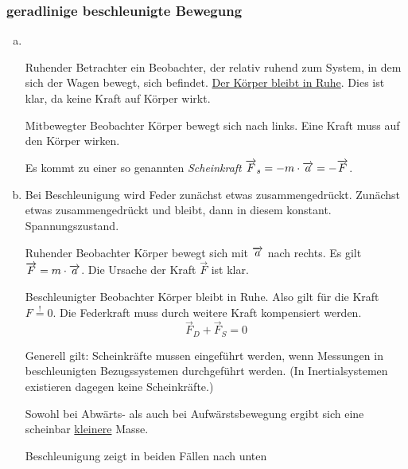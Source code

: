\documentclass[a4paper,10pt]{scrartcl}
\begin{document}
\subsubsection{geradlinige beschleunigte Bewegung}
\begin{enumerate}[a)]
 \item {}\\
\begin{seg}{Ruhender Betrachter}
ein Beobachter, der relativ ruhend zum System, in dem sich der Wagen bewegt, sich befindet.
\underline{Der Körper bleibt in Ruhe}. Dies ist klar, da keine Kraft auf Körper wirkt.
\end{seg}
\begin{seg}{Mitbewegter Beobachter}
 Körper bewegt sich nach links. Eine Kraft muss auf den Körper wirken.
\end{seg}
Es kommt zu einer so genannten \emph{Scheinkraft} $\overrightarrow{F}_s=-m\cdot \overrightarrow{a}=-\overrightarrow{F}$.
\item {}
Bei Beschleunigung wird Feder zunächst etwas zusammengedrückt. Zunächst etwas zusammengedrückt und bleibt, dann in diesem konstant. Spannungszustand.
\begin{seg}{Ruhender Beobachter}
 Körper bewegt sich mit $\overrightarrow{a}$ nach rechts. Es gilt $\overrightarrow{F}=m\cdot \overrightarrow{a}$. Die Ursache der Kraft $\vec F$ ist klar.\\
\end{seg}
\begin{seg}{Beschleunigter Beobachter}
 Körper bleibt in Ruhe. Also gilt für die Kraft $F\stackrel{!}{=}0$. Die Federkraft muss durch weitere Kraft kompensiert werden.
\[
 \vec F_D+\vec F_S=0
\]
\end{seg}
Generell gilt: Scheinkräfte mussen eingeführt werden, wenn Messungen in beschleunigten Bezugssystemen durchgeführt werden.
(In Inertialsystemen existieren dagegen keine Scheinkräfte.)
\begin{ex*}
Sowohl bei Abwärts- als auch bei Aufwärstsbewegung ergibt sich eine scheinbar \underline{kleinere} Masse.
\end{ex*}
\begin{att*}
 Beschleunigung zeigt in beiden Fällen nach unten
\end{att*}

\end{enumerate}
\end{document}
